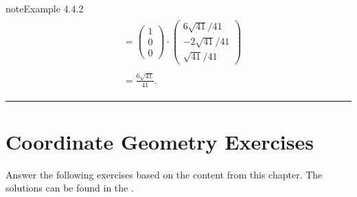 \documentclass[letterpaper,10pt,english]{jupyterBook}
\begin{document}
\begin{sphinxadmonition}{note}{Example 4.4.2}
\begin{equation*}
\begin{split}
\begin{align*}
    &= \begin{pmatrix} 1 \\ 0 \\ 0 \end{pmatrix} \cdot
    \begin{pmatrix} 6\sqrt{41}/41 \\ -2\sqrt{41}/41 \\ \sqrt{41}/41 \end{pmatrix} \\ \\
    &= \frac{6 \sqrt{41}}{41}.
\end{align*} \end{split}
\end{equation*}\end{sphinxadmonition}


\bigskip\hrule\bigskip


\sphinxstepscope


\section{Co\sphinxhyphen{}ordinate Geometry Exercises}
\label{\detokenize{_pages/4.4_Coordinate_geometry_exercises:co-ordinate-geometry-exercises}}\label{\detokenize{_pages/4.4_Coordinate_geometry_exercises::doc}}
\sphinxAtStartPar
Answer the following exercises based on the content from this chapter. The solutions can be found in the {\hyperref[\detokenize{_pages/A4_Coordinate_geometry_exercises_solutions:co-ordinate-geometry-exercises-solutions-section}]{}}.
 \label{exercise:geometry-ex-line-plane-equations}
\end{document}
